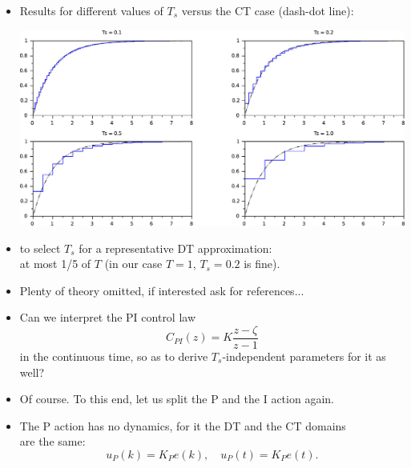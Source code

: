 \begin{frame}
\myPause
 \begin{itemize}[<+-| alert@+>]
 \item Results for different values of $T_s$ versus the CT case (dash-dot line):
       \begin{center}
        \includegraphics[width=0.60\columnwidth]{./Unit-06/img/CTvsDTexample-step.pdf}
       \end{center}
 \item {} to select $T_s$ for a representative DT approximation:\\
       at most 1/5 of $T$ (in our case $T=1$, $T_s=0.2$ is fine).
 \item Plenty of theory omitted, if interested ask for references...
 \end{itemize}
\end{frame}

\begin{frame}
\myPause
 \begin{itemize}[<+-| alert@+>]
 \item Can we interpret the PI control law
       \begin{displaymath}
        C_{PI}(z) = K \frac{z-\zeta}{z-1}
       \end{displaymath}
       in the continuous time, so as to derive $T_s$-independent parameters for it as well?
 \item Of course. To this end, let us split the P and the I action again.
 \item The P action has no dynamics, for it the DT and the CT domains\\
       are the same:
       \begin{displaymath}
        u_P(k) = K_P e(k), \quad
        u_P(t) = K_P e(t).
       \end{displaymath}
 \end{itemize}
\end{frame}

